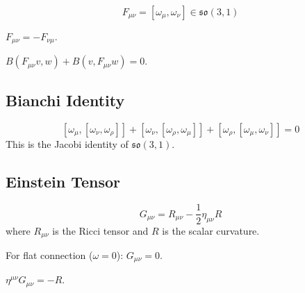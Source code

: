 \begin{definition}[Curvature]
\label{def:mat_curvature}
\leanok
\[
F_{\mu\nu} = [\omega_\mu, \omega_\nu] \in \mathfrak{so}(3,1)
\]
\end{definition}

\begin{theorem}
\label{thm:mat_curvature_antisymm}
\leanok
$F_{\mu\nu} = -F_{\nu\mu}$.
\end{theorem}

\begin{theorem}
\label{thm:mat_curvature_minkowski}
\leanok
$B(F_{\mu\nu} v, w) + B(v, F_{\mu\nu} w) = 0$.
\end{theorem}

\subsection{Bianchi Identity}

\begin{theorem}
\label{thm:mat_bianchi}
\leanok
\[
[\omega_\mu, [\omega_\nu, \omega_\rho]] + [\omega_\nu, [\omega_\rho, \omega_\mu]] + [\omega_\rho, [\omega_\mu, \omega_\nu]] = 0
\]
This is the Jacobi identity of $\mathfrak{so}(3,1)$.
\end{theorem}

\subsection{Einstein Tensor}

\begin{definition}
\label{def:mat_einstein}
\leanok
\[
G_{\mu\nu} = R_{\mu\nu} - \frac{1}{2} \eta_{\mu\nu} R
\]
where $R_{\mu\nu}$ is the Ricci tensor and $R$ is the scalar curvature.
\end{definition}

\begin{theorem}
\label{thm:mat_vacuum_einstein}
\leanok
For flat connection ($\omega = 0$): $G_{\mu\nu} = 0$.
\end{theorem}

\begin{theorem}
\label{thm:mat_einstein_trace}
\leanok
$\eta^{\mu\nu} G_{\mu\nu} = -R$.
\end{theorem}

